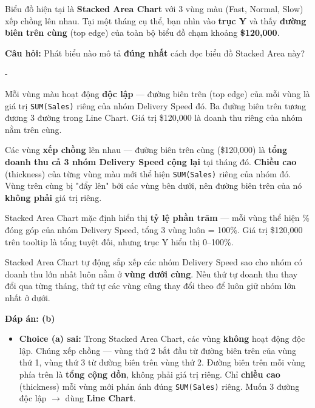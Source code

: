 \documentclass[12pt]{article}
\newcounter{choice}
\renewcommand\thechoice{($\alph{choice}$)}
\newcommand\choicelabel{\thechoice}
\newenvironment{choices}%
  {\list{\choicelabel}%
     {\usecounter{choice}\def\makelabel##1{\hss\llap{##1}}%
       \settowidth{\leftmargin}{W.\hskip\labelsep\hskip 0 em}%
       \def\choice{%
         \item
       } %
       \labelwidth\leftmargin\advance\labelwidth-\labelsep
       \topsep=0pt
       \partopsep=0pt
     }%
  }%
  {\endlist}
\begin{document}
\begin{enumerate}[label=\textbf{Câu \arabic*.}, leftmargin=*, labelsep=1em, itemsep=2em]
Biểu đồ hiện tại là \textbf{Stacked Area Chart} với 3 vùng màu (Fast, Normal, Slow) xếp chồng lên nhau. Tại một tháng cụ thể, bạn nhìn vào \textbf{trục Y} và thấy \textbf{đường biên trên cùng} (top edge) của toàn bộ biểu đồ chạm khoảng \textbf{\$120,000}.

\textbf{Câu hỏi:} Phát biểu nào mô tả \textbf{đúng nhất} cách đọc biểu đồ Stacked Area này?

\begin{choices}
    \choice Mỗi vùng màu hoạt động \textbf{độc lập} --- đường biên trên (top edge) của mỗi vùng là giá trị \texttt{SUM(Sales)} riêng của nhóm Delivery Speed đó. Ba đường biên trên tương đương 3 đường trong Line Chart. Giá trị \$120,000 là doanh thu riêng của nhóm nằm trên cùng.

    \choice Các vùng \textbf{xếp chồng} lên nhau --- đường biên trên cùng (\$120,000) là \textbf{tổng doanh thu cả 3 nhóm Delivery Speed cộng lại} tại tháng đó. \textbf{Chiều cao} (thickness) của từng vùng màu mới thể hiện \texttt{SUM(Sales)} riêng của nhóm đó. Vùng trên cùng bị "đẩy lên" bởi các vùng bên dưới, nên đường biên trên của nó \textbf{không phải} giá trị riêng.

    \choice Stacked Area Chart mặc định hiển thị \textbf{tỷ lệ phần trăm} --- mỗi vùng thể hiện \% đóng góp của nhóm Delivery Speed, tổng 3 vùng luôn = 100\%. Giá trị \$120,000 trên tooltip là tổng tuyệt đối, nhưng trục Y hiển thị 0--100\%.

    \choice Stacked Area Chart tự động sắp xếp các nhóm Delivery Speed sao cho nhóm có doanh thu lớn nhất luôn nằm ở \textbf{vùng dưới cùng}. Nếu thứ tự doanh thu thay đổi qua từng tháng, thứ tự các vùng cũng thay đổi theo để luôn giữ nhóm lớn nhất ở dưới.
\end{choices}

\textbf{Đáp án: (b)}

\begin{guidelinebox}

\begin{itemize}
    \item \textbf{Choice (a) sai:} Trong Stacked Area Chart, các vùng \textbf{không} hoạt động độc lập. Chúng xếp chồng --- vùng thứ 2 bắt đầu từ đường biên trên của vùng thứ 1, vùng thứ 3 từ đường biên trên vùng thứ 2. Đường biên trên mỗi vùng phía trên là \textbf{tổng cộng dồn}, không phải giá trị riêng. Chỉ \textbf{chiều cao} (thickness) mỗi vùng mới phản ánh đúng \texttt{SUM(Sales)} riêng. Muốn 3 đường độc lập $\rightarrow$ dùng \textbf{Line Chart}.


\end{itemize}
\end{guidelinebox}
\end{enumerate}
\end{document}
